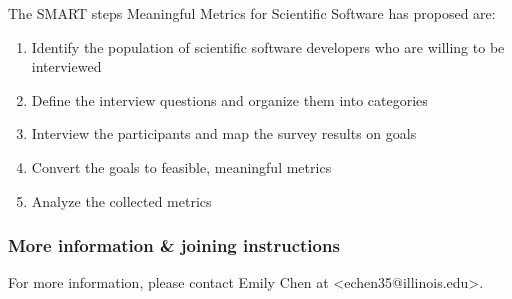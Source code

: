 The SMART steps Meaningful Metrics for Scientific Software has proposed are:
\begin{enumerate}
\item Identify the population of scientific software developers who are willing to be interviewed
\item Define the interview questions and organize them into categories
\item Interview the participants and map the survey results on goals
\item Convert the goals to feasible, meaningful metrics
\item Analyze the collected metrics
\end{enumerate}

\subsubsection{More information \& joining instructions}


For more information, please contact Emily Chen at <echen35@illinois.edu>.
